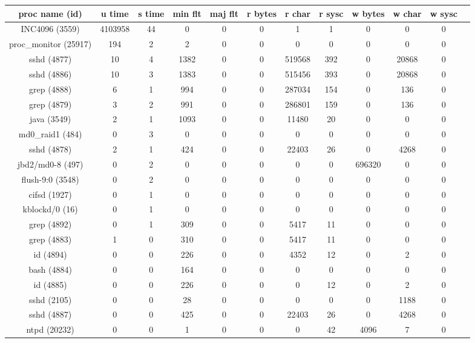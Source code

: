 \begin{table}[h]
\begin{center}
\begin{tabular}{|c|c|c|c|c|c|c|c|c|c|c|c|} \hline
proc name (id) & u time & s time & min flt & maj flt & r bytes & r char & r sysc & w bytes & w char & w sysc\\ \hline
INC4096 (3559) & 4103958 & 44 & 0 & 0 & 0 & 1 & 1 & 0 & 0 & 0 \\ \hline
proc\_monitor (25917) & 194 & 2 & 2 & 0 & 0 & 0 & 0 & 0 & 0 & 0 \\ \hline
sshd (4877) & 10 & 4 & 1382 & 0 & 0 & 519568 & 392 & 0 & 20868 & 0 \\ \hline
sshd (4886) & 10 & 3 & 1383 & 0 & 0 & 515456 & 393 & 0 & 20868 & 0 \\ \hline
grep (4888) & 6 & 1 & 994 & 0 & 0 & 287034 & 154 & 0 & 136 & 0 \\ \hline
grep (4879) & 3 & 2 & 991 & 0 & 0 & 286801 & 159 & 0 & 136 & 0 \\ \hline
java (3549) & 2 & 1 & 1093 & 0 & 0 & 11480 & 20 & 0 & 0 & 0 \\ \hline
md0\_raid1 (484) & 0 & 3 & 0 & 0 & 0 & 0 & 0 & 0 & 0 & 0 \\ \hline
sshd (4878) & 2 & 1 & 424 & 0 & 0 & 22403 & 26 & 0 & 4268 & 0 \\ \hline
jbd2/md0-8 (497) & 0 & 2 & 0 & 0 & 0 & 0 & 0 & 696320 & 0 & 0 \\ \hline
flush-9:0 (3548) & 0 & 2 & 0 & 0 & 0 & 0 & 0 & 0 & 0 & 0 \\ \hline
cifsd (1927) & 0 & 1 & 0 & 0 & 0 & 0 & 0 & 0 & 0 & 0 \\ \hline
kblockd/0 (16) & 0 & 1 & 0 & 0 & 0 & 0 & 0 & 0 & 0 & 0 \\ \hline
grep (4892) & 0 & 1 & 309 & 0 & 0 & 5417 & 11 & 0 & 0 & 0 \\ \hline
grep (4883) & 1 & 0 & 310 & 0 & 0 & 5417 & 11 & 0 & 0 & 0 \\ \hline
id (4894) & 0 & 0 & 226 & 0 & 0 & 4352 & 12 & 0 & 2 & 0 \\ \hline
bash (4884) & 0 & 0 & 164 & 0 & 0 & 0 & 0 & 0 & 0 & 0 \\ \hline
id (4885) & 0 & 0 & 226 & 0 & 0 & 0 & 12 & 0 & 2 & 0 \\ \hline
sshd (2105) & 0 & 0 & 28 & 0 & 0 & 0 & 0 & 0 & 1188 & 0 \\ \hline
sshd (4887) & 0 & 0 & 425 & 0 & 0 & 22403 &26 & 0 & 4268 & 0 \\ \hline
ntpd (20232) & 0 & 0 & 1 & 0 & 0 & 0 & 42 & 4096 & 7 & 0 \\ \hline

\end{tabular}
\end{center}
\end{table}
